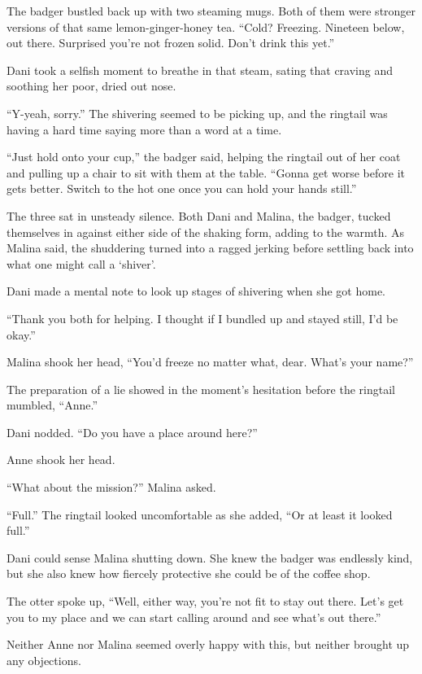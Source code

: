 The badger bustled back up with two steaming mugs. Both of them were stronger versions of that same lemon-ginger-honey tea. ``Cold? Freezing. Nineteen below, out there. Surprised you're not frozen solid. Don't drink this yet.''

Dani took a selfish moment to breathe in that steam, sating that craving and soothing her poor, dried out nose.

``Y-yeah, sorry.'' The shivering seemed to be picking up, and the ringtail was having a hard time saying more than a word at a time.

``Just hold onto your cup,'' the badger said, helping the ringtail out of her coat and pulling up a chair to sit with them at the table. ``Gonna get worse before it gets better. Switch to the hot one once you can hold your hands still.''

The three sat in unsteady silence. Both Dani and Malina, the badger, tucked themselves in against either side of the shaking form, adding to the warmth. As Malina said, the shuddering turned into a ragged jerking before settling back into what one might call a `shiver'.

Dani made a mental note to look up stages of shivering when she got home.

``Thank you both for helping. I thought if I bundled up and stayed still, I'd be okay.''

Malina shook her head, ``You'd freeze no matter what, dear. What's your name?''

The preparation of a lie showed in the moment's hesitation before the ringtail mumbled, ``Anne.''

Dani nodded. ``Do you have a place around here?''

Anne shook her head.

``What about the mission?'' Malina asked.

``Full.'' The ringtail looked uncomfortable as she added, ``Or at least it looked full.''

Dani could sense Malina shutting down. She knew the badger was endlessly kind, but she also knew how fiercely protective she could be of the coffee shop.

The otter spoke up, ``Well, either way, you're not fit to stay out there. Let's get you to my place and we can start calling around and see what's out there.''

Neither Anne nor Malina seemed overly happy with this, but neither brought up any objections.

\secdiv{}

